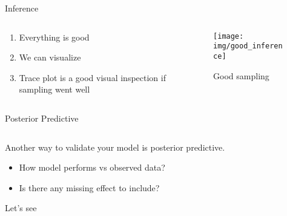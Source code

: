 \documentclass{beamer}
\begin{document}
\begin{frame}{Inference}
\begin{columns}
    \begin{column}{0.5\linewidth}
    \begin{enumerate}
        \item Everything is good
        \item We can visualize
        \item<2> Trace plot is a good visual inspection if sampling went well
    \end{enumerate}
    \end{column}
    \begin{column}{0.5\linewidth}
    \begin{figure}
        \centering
        \texttt{[image: img/good\_inference]}
        \caption{Good sampling}
    \end{figure}
    \end{column}
    \end{columns}
\end{frame}
\begin{frame}{Posterior Predictive}
\begin{columns}
    \begin{column}{0.5\linewidth}
    Another way to validate your model is posterior predictive.
    \begin{itemize}
        \item How model performs vs observed data?
        \item Is there any missing effect to include?
    \end{itemize}
    Let's see
    \end{column}
    \begin{column}{0.5\linewidth}
    \end{column}
\end{columns}
\end{frame}
\end{document}
